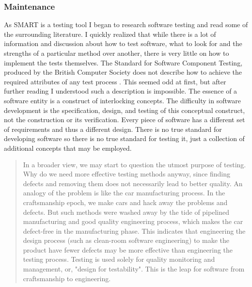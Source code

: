 \documentclass[a4paper, 11pt, titlepage]{article}
\begin{document}
\subsubsection{Maintenance} 
As SMART is a testing tool I began to research software testing and read some of the surrounding literature. I quickly realized that while there is a lot of information and discussion about how to test software, what to look for and the strengths of a particular method over another, there is very little on how to implement the tests themselves. The Standard for Software Component Testing, produced by the British Computer Society does not describe how to achieve the required attributes of any test process \cite{BCStesting}. This seemed odd at first, but after further reading I understood such a description is impossible. The essence of a software entity is a construct of interlocking concepts. The difficulty in software development is the specification, design, and testing of this conceptual construct, not the construction or its verification. \cite{NoBullet} Every piece of software has a different set of requirements and thus a different design. There is no true standard for developing software so there is no true standard for testing it, just a collection of additional concepts that may be employed.  
\begin{quote} 
In a broader view, we may start to question the utmost purpose of testing. Why do we need more effective testing methods anyway, since finding defects and removing them does not necessarily lead to better quality. An analogy of the problem is like the car manufacturing process. In the craftsmanship epoch, we make cars and hack away the problems and defects. But such methods were washed away by the tide of pipelined manufacturing and good quality engineering process, which makes the car defect-free in the manufacturing phase. This indicates that engineering the design process (such as clean-room software engineering) to make the product have fewer defects may be more effective than engineering the testing process. Testing is used solely for quality monitoring and management, or, "design for testability". This is the leap for software from craftsmanship to engineering. 
\end{quote} \cite{cMellonTest} 
 
\end{document}
